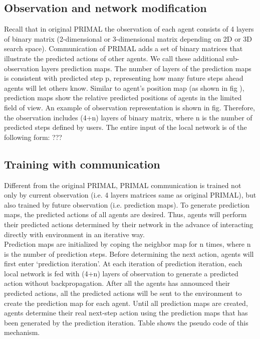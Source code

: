 \documentclass[sigconf,authordraft, nonacm=true]{acmart}
\begin{document}
\subsection{Observation and network modification}
Recall that in original PRIMAL the observation of each agent consists of 4 layers of binary matrix (2-dimensional or 3-dimensional matrix depending on 2D or 3D search space). Communication of PRIMAL adds a set of binary matrices that illustrate the predicted actions of other agents. We call these additional sub-observation layers prediction maps. The number of layers of the prediction maps is consistent with predicted step p, representing how many future steps ahead agents will let others know. Similar to agent’s position map (as shown in fig ), prediction maps show the relative predicted positions of agents in the limited field of view. An example of observation representation is shown in fig. Therefore, the observation includes (4+n) layers of binary matrix, where n is the number of predicted steps defined by users. The entire input of the local network is of the following form:
???

\subsection{Training with communication}
Different from the original PRIMAL, PRIMAL communication is trained not only by current observation (i.e. 4 layers matrices same as original PRIMAL), but also trained by future observation (i.e. prediction maps). To generate prediction maps, the predicted actions of all agents are desired. Thus, agents will perform their predicted actions determined by their network in the advance of interacting directly with environment in an iterative way. 
\\Prediction maps are initialized by coping the neighbor map for n times, where n is the number of prediction steps. Before determining the next action, agents will first enter ‘prediction iteration’. At each iteration of prediction iteration, each local network is fed with (4+n) layers of observation to generate a predicted action without backpropagation. After all the agents has announced their predicted actions, all the predicted actions will be sent to the environment to create the prediction map for each agent. Until all prediction maps are created, agents determine their real next-step action using the prediction maps that has been generated by the prediction iteration.  Table shows the pseudo code of this mechanism.
\end{document}
